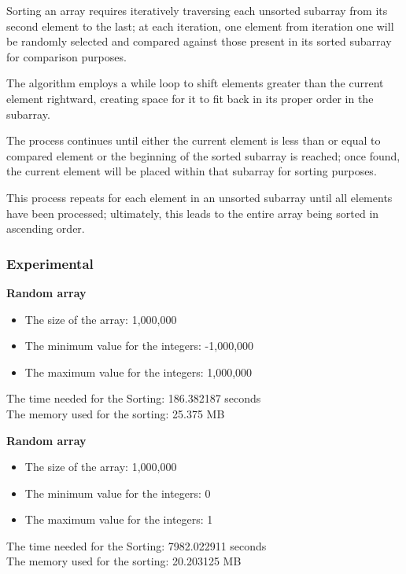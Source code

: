 \documentclass{article}
\begin{document}
Sorting an array requires iteratively traversing each unsorted subarray from its second element to the last; at each iteration, one element from iteration one will be randomly selected and compared against those present in its sorted subarray for comparison purposes.

The algorithm employs a while loop to shift elements greater than the current element rightward, creating space for it to fit back in its proper order in the subarray.

The process continues until either the current element is less than or equal to compared element or the beginning of the sorted subarray is reached; once found, the current element will be placed within that subarray for sorting purposes.

This process repeats for each element in an unsorted subarray until all elements have been processed; ultimately, this leads to the entire array being sorted in ascending order.

\restoregeometry

\subsubsection{Experimental}


\textbf{Random array}

\begin{itemize}
    \item The size of the array: 1,000,000
    \item The minimum value for the integers: -1,000,000
    \item The maximum value for the integers: 1,000,000
\end{itemize}

The time needed for the Sorting: 186.382187 seconds\\
The memory used for the sorting: 25.375 MB

\textbf{Random array}

\begin{itemize}
    \item The size of the array: 1,000,000
    \item The minimum value for the integers: 0
    \item The maximum value for the integers: 1
\end{itemize}

The time needed for the Sorting: 7982.022911 seconds\\
The memory used for the sorting: 20.203125 MB
\end{document}
